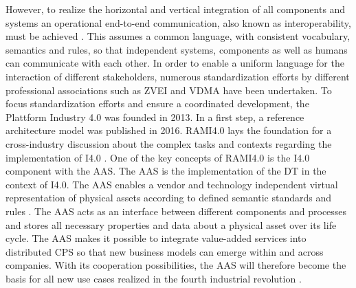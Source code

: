 However, to realize the horizontal and vertical integration of all components and systems an operational end-to-end communication, also known as interoperability, must be achieved \cite[p. 858]{Uslander2015ReferenceApproach}. This assumes a common language, with consistent vocabulary, semantics and rules, so that independent systems, components as well as humans can communicate with each other. In order to enable a uniform language for the interaction of different stakeholders, numerous standardization efforts by different professional associations such as \ac{ZVEI} and \ac{VDMA} have been undertaken. To focus standardization efforts and ensure a coordinated development, the Plattform Industry 4.0 was founded in 2013. In a first step, a reference architecture model was published in 2016. \ac{RAMI4.0} lays the foundation for a cross-industry discussion about the complex tasks and contexts regarding the implementation of \ac{I4.0} \cite[p. 4]{Heidel2017ReferenzarchitekturmodellIndustrie4.0Komponente}. One of the key concepts of \ac{RAMI4.0} is the \ac{I4.0} component with the \ac{AAS}. The \ac{AAS} is the implementation of the \ac{DT} in the context of \ac{I4.0}. The \ac{AAS} enables a vendor and technology independent virtual representation of physical assets according to defined semantic standards and rules \cite[p. 5]{Wagner2017ThePlant}. The \ac{AAS} acts as an interface between different components and processes and stores all necessary properties and data about a physical asset over its life cycle. The \ac{AAS} makes it possible to integrate value-added services into distributed \ac{CPS} so that new business models can emerge within and across companies. With its cooperation possibilities, the \ac{AAS} will therefore become the basis for all new use cases realized in the fourth industrial revolution \cite[p. 67]{Heidel2017ReferenzarchitekturmodellIndustrie4.0Komponente}.    

